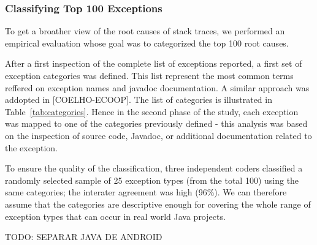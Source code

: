\documentclass[conference]{IEEEtran}
\begin{document}
\subsubsection{Classifying Top 100 Exceptions}

To get a broather view of the root causes of stack traces, we performed an empirical evaluation
whose goal was to categorized the top 100 root causes.

After a first inspection of the complete list of exceptions reported, a first set of exception 
categories was defined. This list represent the most common terms reffered on exception
names and javadoc documentation. A similar approach was addopted in [COELHO-ECOOP].
The list of categories is illustrated in Table~\ref{tab:categories}. Hence in the second phase
of the study, each exception was mapped to one of the categories previously defined - 
this analysis was based on the inspection of source code, Javadoc, or additional 
documentation related to the exception. 

To ensure the quality of the classification, three independent coders classified a randomly selected
sample of 25 exception types (from the total 100) using the same categories;
the interater agreement was high (96\%). We can therefore assume that the
categories are descriptive enough for covering the whole range of exception
types that can occur in real world Java projects.


TODO: SEPARAR JAVA DE ANDROID
\end{document}
